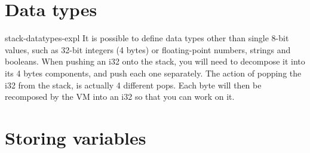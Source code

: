 \documentclass[preview]{standalone}
\begin{document}
\section{Data types}

\begin{snippet}{stack-datatypes-expl}
    It is possible to define data types other than single 8-bit values, such as 32-bit integers (4 bytes)
    or floating-point numbers, strings and booleans.
    When pushing an i32 onto the stack, you will need to decompose it into its 4 bytes components, and push each one
    separately. The action of popping the i32 from the stack, is actually 4 different pops. Each byte will then be recomposed
    by the VM into an i32 so that you can work on it.
\end{snippet}

\section{Storing variables}
\end{document}
